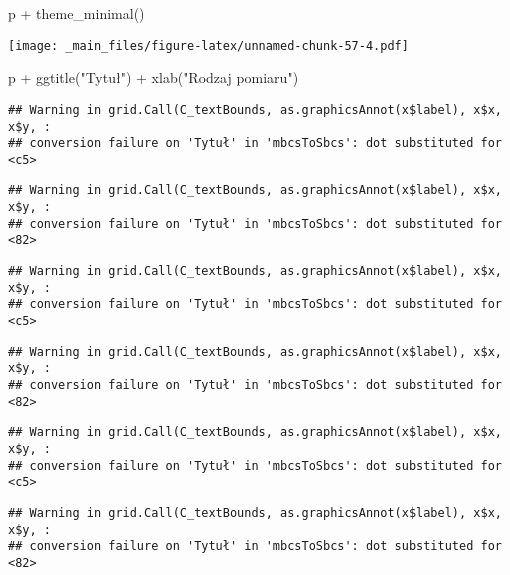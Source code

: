 \documentclass[
]{book}
\newenvironment{Shaded}{\begin{snugshade}}{\end{snugshade}}
\newcommand{\FunctionTok}[1]{\textcolor[rgb]{0.00,0.00,0.00}{#1}}
\newcommand{\NormalTok}[1]{#1}
\newcommand{\SpecialCharTok}[1]{\textcolor[rgb]{0.00,0.00,0.00}{#1}}
\newcommand{\StringTok}[1]{\textcolor[rgb]{0.31,0.60,0.02}{#1}}
\begin{document}
\begin{Shaded}
\begin{Highlighting}[]
\NormalTok{p }\SpecialCharTok{+} \FunctionTok{theme\_minimal}\NormalTok{()}
\end{Highlighting}
\end{Shaded}

\texttt{[image: \_main\_files/figure-latex/unnamed-chunk-57-4.pdf]}

\begin{Shaded}
\begin{Highlighting}[]
\NormalTok{p }\SpecialCharTok{+} \FunctionTok{ggtitle}\NormalTok{(}\StringTok{"Tytuł"}\NormalTok{) }\SpecialCharTok{+} \FunctionTok{xlab}\NormalTok{(}\StringTok{"Rodzaj pomiaru"}\NormalTok{)}
\end{Highlighting}
\end{Shaded}

\begin{verbatim}
## Warning in grid.Call(C_textBounds, as.graphicsAnnot(x$label), x$x, x$y, :
## conversion failure on 'Tytuł' in 'mbcsToSbcs': dot substituted for <c5>
\end{verbatim}

\begin{verbatim}
## Warning in grid.Call(C_textBounds, as.graphicsAnnot(x$label), x$x, x$y, :
## conversion failure on 'Tytuł' in 'mbcsToSbcs': dot substituted for <82>
\end{verbatim}

\begin{verbatim}
## Warning in grid.Call(C_textBounds, as.graphicsAnnot(x$label), x$x, x$y, :
## conversion failure on 'Tytuł' in 'mbcsToSbcs': dot substituted for <c5>
\end{verbatim}

\begin{verbatim}
## Warning in grid.Call(C_textBounds, as.graphicsAnnot(x$label), x$x, x$y, :
## conversion failure on 'Tytuł' in 'mbcsToSbcs': dot substituted for <82>
\end{verbatim}

\begin{verbatim}
## Warning in grid.Call(C_textBounds, as.graphicsAnnot(x$label), x$x, x$y, :
## conversion failure on 'Tytuł' in 'mbcsToSbcs': dot substituted for <c5>
\end{verbatim}

\begin{verbatim}
## Warning in grid.Call(C_textBounds, as.graphicsAnnot(x$label), x$x, x$y, :
## conversion failure on 'Tytuł' in 'mbcsToSbcs': dot substituted for <82>
\end{verbatim}
\end{document}
